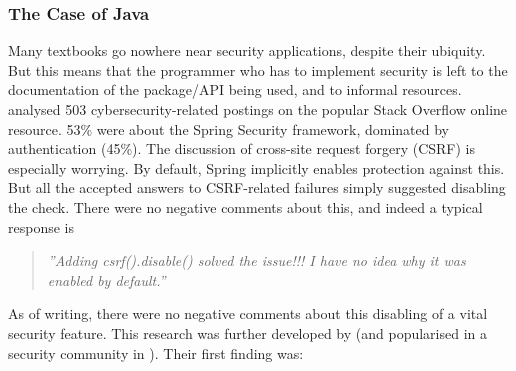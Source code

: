 \documentclass[sigconf]{acmart}
\begin{document}
\subsubsection{The Case of Java}
\begin{comment}
Took out footnotes for space

Many textbooks books go nowhere near security applications.  But this means that the programmer who has to implement security is left to the documentation of the package/API being used, and to informal resources. \cite{Mengetal2018a} analysed 503 cybersecurity-related postings on the popular Stack Overflow online resource.  53\% were about the Spring Security framework  \footnote{\url{https://projects.spring.io/spring-security/}}, dominated by authentication (45\%). The discussion \cite[\S4.3.1]{Mengetal2018a} of cross-site request forgery (CSRF) is especially worrying.  By default, Spring implicitly enables protection against this. But all the accepted answers to CSRF-related failures simply suggested disabling the check. There were no negative comments about this, and indeed a typical response is 
\end{comment}

Many textbooks go nowhere near security applications, despite their ubiquity.  But this means that the programmer who has to implement security is left to the documentation of the package/API being used, and to informal resources. \cite{Mengetal2018a} analysed 503 cybersecurity-related postings on the popular Stack Overflow online resource.  53\% were about the Spring Security framework, dominated by authentication (45\%). The discussion \cite[\S4.3.1]{Mengetal2018a} of cross-site request forgery (CSRF) is especially worrying.  By default, Spring implicitly enables protection against this. But all the accepted answers to CSRF-related failures simply suggested disabling the check. There were no negative comments about this, and indeed a typical response is 
\begin{quote}
	\textit{''Adding csrf().disable() solved the issue!!! I have no idea why it was enabled by default.''}
\end{quote}
As of writing, there were no negative comments about this disabling of a vital security feature. This research was further developed by \cite{Chenetal2019a}  (and popularised in a security community in \cite{Zorz2019a}). Their first finding was:
\end{document}
